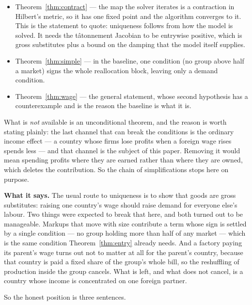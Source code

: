 \documentclass[11pt]{article}
\newcommand{\says}[1]{\smallskip\noindent\textbf{What it says.} #1\smallskip}
\theoremstyle{plain}
\theoremstyle{remark}
\theoremstyle{definition}
\begin{document}
\begin{itemize}
\item Theorem~\ref{thm:contract} --- the map the solver iterates is a contraction in
Hilbert's metric, so it has one fixed point and the algorithm converges to it. This is
the statement to quote: uniqueness follows from how the model is solved.  It needs the
tâtonnement Jacobian to be entrywise positive, which is gross substitutes plus a bound on
the damping that the model itself supplies.
\item Theorem~\ref{thm:simple} --- in the baseline, one condition (no group above half
a market) signs the whole reallocation block, leaving only a demand condition.
\item Theorem~\ref{thm:wage} --- the general statement, whose second hypothesis has a
counterexample and is the reason the baseline is what it is.
\end{itemize}

\noindent What is \emph{not} available is an unconditional theorem, and the reason is
worth stating plainly: the last channel that can break the conditions is the ordinary
income effect --- a country whose firms lose profits when a foreign wage rises spends
less --- and that channel is the subject of this paper. Removing it would mean spending
profits where they are earned rather than where they are owned, which deletes the
contribution. So the chain of simplifications stops here on purpose.

\says{The usual route to uniqueness is to show that goods are gross substitutes:
raising one country's wage should raise demand for everyone else's labour. Two things
were expected to break that here, and both turned out to be manageable. Markups that
move with size contribute a term whose sign is settled by a single condition --- no
group holding more than half of any market --- which is the same condition
Theorem~\ref{thm:entry} already needs. And a factory paying its parent's wage turns out
not to matter at all for the parent's country, because that country is paid a fixed
share of the group's whole bill, so the reshuffling of production inside the group
cancels. What is left, and what does not cancel, is a country whose income is
concentrated on one foreign partner.}

\noindent So the honest position is three sentences.
\end{document}
